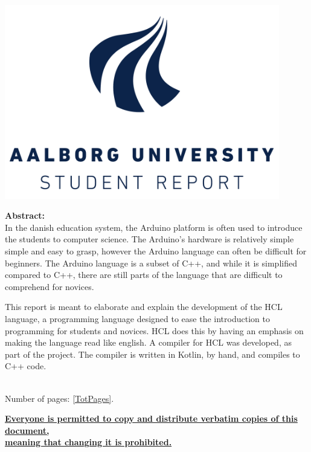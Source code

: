 \begin{minipage}[T]{0.45\textwidth}
 \begin{flushright}
  \includegraphics[width=0.9\textwidth]{images/aau_logo.pdf}\\[1.0 cm]
 \end{flushright}
 \begin{flushleft}
  \textbf{Abstract:}\\
  In the danish education system, the Arduino platform is often used to introduce the students to computer science. 
  The Arduino's hardware is relatively simple simple and easy to grasp, however the Arduino language can often be difficult for beginners.
  The Arduino language is a subset of C++, and while it is simplified compared to C++, there are still parts of the language that are difficult to comprehend for novices.
  
  This report is meant to elaborate and explain the development of the HCL language, a programming language designed to ease the introduction to programming for students and novices.
  HCL does this by having an emphasis on making the language read like english.
  A compiler for HCL was developed, as part of the project.
  The compiler is written in Kotlin, by hand, and compiles to C++ code.
  
  
 \end{flushleft}
\end{minipage}\\
Number of pages: \ref{TotPages}.\\
\begin{center}
 \begin{scriptsize}
  \textbf{\underline{Everyone is permitted to copy and distribute verbatim copies of this document,}}\\ \textbf{\underline{ meaning that changing it is prohibited.}}
 \end{scriptsize}
\end{center}